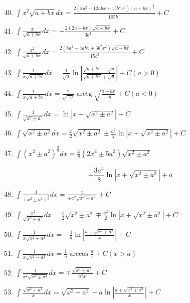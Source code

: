 \documentclass[lang=cn,newtx,10pt,scheme=chinese]{elegantbook}
\begin{document}
40. \(\int {x}^{2}\sqrt{a + {bx}}{dx} = \frac{2\left( {8{a}^{2} - {12abx} + {15}{b}^{2}{x}^{2}}\right) {\left( a + bx\right) }^{\frac{3}{2}}}{{105}{b}^{3}} + C\)

41. \(\int \frac{x}{\sqrt{a + {bx}}}{dx} = - \frac{2\left( {{2a} - {bx}}\right) \sqrt{a + {bx}}}{3{b}^{2}} + C\)

42. \(\int \frac{{x}^{2}}{\sqrt{a + {bx}}}{dx} = \frac{2\left( {8{a}^{2} - {4abx} + 3{b}^{2}{x}^{2}}\right) \sqrt{a + {bx}}}{{15}{b}^{3}} + C\)

43. \(\int \frac{1}{x\sqrt{a + {bx}}}{dx} = \frac{1}{\sqrt{a}}\ln \left| \frac{\sqrt{a + {bx}} - \sqrt{a}}{\sqrt{a + {bx}} + \sqrt{a}}\right| + C\left( {a > 0}\right)\)

44. \(\int \frac{1}{x\sqrt{a + {bx}}}{dx} = \frac{2}{\sqrt{-a}}\operatorname{arctg}\sqrt{\frac{a + {bx}}{-a}} + C\left( {a < 0}\right)\)

45. \(\int \frac{1}{\sqrt{{x}^{2} \pm {a}^{2}}}{dx} = \ln \left| {x + \sqrt{{x}^{2} \pm {a}^{2}}}\right| + C\)

46. \(\int \sqrt{{x}^{2} \pm {a}^{2}}{dx} = \frac{x}{2}\sqrt{{x}^{2} \pm {a}^{2}} \pm \frac{{a}^{2}}{2}\ln \left| {x + \sqrt{{x}^{2} \pm {a}^{2}}}\right| + C\)

47. \(\int {\left( {x}^{2} \pm {a}^{2}\right) }^{\frac{3}{2}}{dx} = \frac{x}{8}\left( {2{x}^{2} \pm 5{a}^{2}}\right) \sqrt{{x}^{2} \pm {a}^{2}}\)

\[
+ \frac{3{a}^{4}}{8}\ln \left| {x + \sqrt{{x}^{2} \pm {a}^{2}}}\right| + a
\]

48. \(\int \frac{1}{{\left( {x}^{2} \pm {a}^{2}\right) }^{\frac{3}{2}}}{dx} = \frac{x}{\pm {a}^{2}\sqrt{{x}^{2} \pm {a}^{2}}} + C\)

49. \(\int \frac{{x}^{2}}{\sqrt{{x}^{2} \pm {a}^{2}}}{dx} = \frac{x}{2}\sqrt{{x}^{2} \pm {a}^{2}} \mp \frac{{a}^{2}}{2}\ln \left| {x + \sqrt{{x}^{2} \pm {a}^{2}}}\right| + C\)

50. \(\int \frac{1}{x\sqrt{{x}^{2} + {a}^{2}}}{dx} = - \frac{1}{a}\ln \left| \frac{a + \sqrt{{x}^{2} + {a}^{2}}}{x}\right| + C\)

51. \(\int \frac{1}{x\sqrt{{x}^{2} - {a}^{2}}}{dx} = \frac{1}{a}\arccos \frac{a}{x} + C\left( {x > a}\right)\)

52. \(\int \frac{1}{{x}^{2}\sqrt{{x}^{2} \pm {a}^{2}}}{dx} = \mp \frac{\sqrt{{x}^{2} \pm {a}^{2}}}{{a}^{2}x} + C\)

53. \(\int \frac{\sqrt{{x}^{2} + {a}^{2}}}{x}{dx} = \sqrt{{x}^{2} + {a}^{2}} - a\ln \left| \frac{a + \sqrt{{x}^{2} + {a}^{2}}}{x}\right| + C\)
\end{document}
